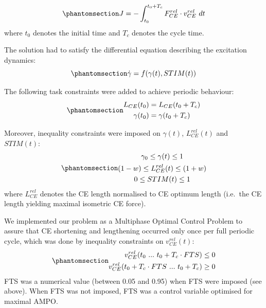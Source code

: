 \documentclass[
  11pt,
  a4paper]{article}
\begin{document}
\begin{equation}\protect\phantomsection\label{eq-objective}{
J = -\int_{t_0}^{t_0+T_c} F_{CE}^{rel} \cdot v_{CE}^{rel} \ dt
}\end{equation} where \(t_0\) denotes the initial time and \(T_c\)
denotes the cycle time.

The solution had to satisfy the differential equation describing the
excitation dynamics:
\begin{equation}\protect\phantomsection\label{eq-dynamic-con}{
\dot{\gamma} = f(\gamma(t),STIM(t))
}\end{equation}

The following task constraints were added to achieve periodic behaviour:
\begin{equation}\protect\phantomsection\label{eq-task-con}{
\begin{gathered}
  L_{CE}(t_0) = L_{CE}(t_0+T_c) \\
  \gamma(t_0) = \gamma(t_0+T_c)
\end{gathered}
}\end{equation}

Moreover, inequality constraints were imposed on \(\gamma(t)\),
\(L_{CE}^{rel}(t)\) and \(STIM(t)\):
\begin{equation}\protect\phantomsection\label{eq-ineq-con}{
\begin{gathered}
  \gamma_0 \leq \gamma(t) \leq 1 \\
  (1-w) \leq L_{CE}^{rel}(t) \leq (1+w) \\
  0 \leq STIM(t) \leq 1
\end{gathered}
}\end{equation} where \(L_{CE}^{rel}\) denotes the CE length normalised
to CE optimum length (i.e.~the CE length yielding maximal isometric CE
force).

We implemented our problem as a Multiphase Optimal Control Problem to
assure that CE shortening and lengthening occurred only once per full
periodic cycle, which was done by inequality constraints on
\(v_{CE}^{rel}(t)\):
\begin{equation}\protect\phantomsection\label{eq-fts-con}{
\begin{aligned}
  v_{CE}^{rel}(t_0 \ ... \ t_0 + T_c \cdot FTS) &\leq 0 \\
  v_{CE}^{rel}(t_0 + T_c \cdot FTS \ ... \ t_0 + T_c) &\geq 0
\end{aligned}
}\end{equation} FTS was a numerical value (between 0.05 and 0.95) when
FTS were imposed (see above). When FTS was not imposed, FTS was a
control variable optimised for maximal AMPO.
\end{document}
